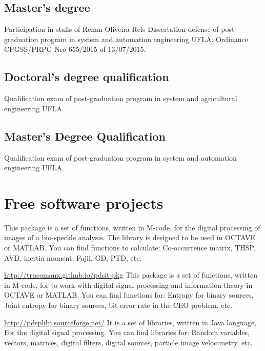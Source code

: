 \documentclass[11pt,a4paper,sans]{moderncv} %
\begin{document}
\subsection{Master's degree}
			{Participation in stalls of Renan Oliveira Reis}
			{Dissertation defense of post-graduation program  in system and automation engineering }{}
			{UFLA. Ordinance CPGSS/PRPG Nro 655/2015 of 13/07/2015.}
\subsection{Doctoral's degree qualification}
			{}
			{Qualification exam of post-graduation program  in system and agricultural engineering}{}
			{UFLA. }
\subsection{Master's Degree Qualification}
			{}
			{Qualification exam of post-graduation program  in system and automation engineering}{}
			{UFLA. }

\section{Free software projects}

			{}
			{}{}
			{This package is a set of functions, written in M-code, 
			for the digital processing of images  of a bio-speckle analysis.
			The library is designed to be used in OCTAVE or MATLAB.
			You can find functions to calculate:
			Co-occurrence matrix, THSP, AVD, inertia moment,
			Fujii, GD, PTD, etc.}

			{\url{http://trucomanx.github.io/pdsit-pkg}}
			{}{}
			{This package is a set of functions, written in M-code, for to work
			with digital signal processing and information theory
			in OCTAVE or MATLAB. You can find functions for:
			Entropy for binary sources, Joint entropy for binary sources,
			bit error rate in the CEO problem, etc. }
			
			{\url{http://pdsplibj.sourceforge.net/}}
			{}{}
			{It is a set of libraries, written in Java language, For
			the digital signal processing. You can find
			libraries for: Random variables,
			vectors, matrices, digital filters,
			digital sources, particle image velocimetry, etc.}
\end{document}
